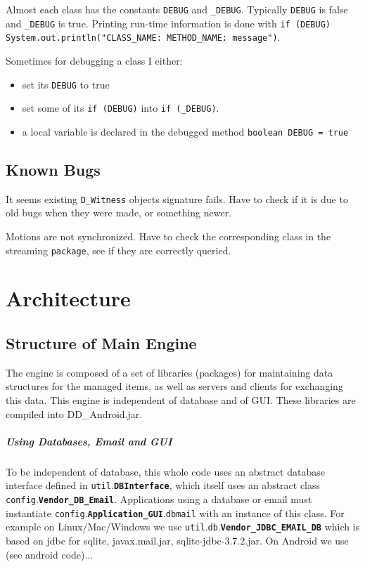 \documentclass{book}
\newcommand{\pkg}[1]{{\tt #1}}
\newcommand{\cls}[1]{{\tt\bf #1}}
\newcommand{\mmb}[1]{{\tt #1}}
\begin{document}
Almost each class has the constants {\tt DEBUG} and {\tt \_DEBUG}. Typically {\tt DEBUG} is false and {\tt \_DEBUG}  is true.
Printing run-time information is done with {\tt if (DEBUG) System.out.println("CLASS\_NAME: METHOD\_NAME: message")}. 

Sometimes for debugging a class I either:
\begin{itemize}
\item
set its {\tt DEBUG} to true
\item
set some of its {\tt if (DEBUG)} into {\tt if (\_DEBUG)}.
\item
a local variable is declared in the debugged method  {\tt boolean DEBUG = true}
\end{itemize}

\section{Known Bugs}

It seems existing {\tt D\_Witness} objects signature fails. Have to check if it is due to old bugs when they were made, or something newer.

Motions are not synchronized. Have to check the corresponding class in the streaming {\tt package}, see if they are correctly queried.

\chapter{Architecture}
\section{Structure of Main Engine}

The engine is composed of a set of libraries (packages) for maintaining data structures for the managed items, as well as servers and clients
for exchanging this data. This engine is independent of database and of GUI. These libraries are compiled into DD\_Android.jar.

\paragraph{Using Databases, Email and GUI}
To be independent of database, this whole code uses an abstract database interface defined in \pkg{util}.\cls{DBInterface}, which
itself uses an abstract class \pkg{config}.\cls{Vendor\_DB\_Email}. Applications using a database or email must instantiate
\pkg{config}.\cls{Application\_GUI}.\mmb{dbmail} with an instance of this class. For example on Linux/Mac/Windows we use \pkg{util}.\pkg{db}.\cls{Vendor\_JDBC\_EMAIL\_DB} which is based on jdbc for sqlite, javax.mail.jar, sqlite-jdbc-3.7.2.jar.
On Android we use (see android code)...
\end{document}
